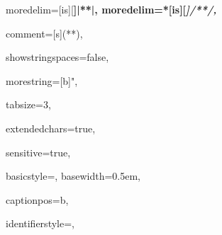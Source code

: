 {%


moredelim=[is][\color{red}\bfseries\ttfamily\underbar]{|*}{*|},
moredelim=*[is][\itshape\rmfamily]{/*}{*/},



comment=[s]{(*}{*)},


showstringspaces=false,

morestring=[b]",



tabsize=3,							

extendedchars=true,  		 		

sensitive=true, 


basicstyle=\linespread{0.8}\ttfamily,
basewidth=0.5em,

captionpos=b,							


identifierstyle={\normalfont\ttfamily\color{black}},


}
